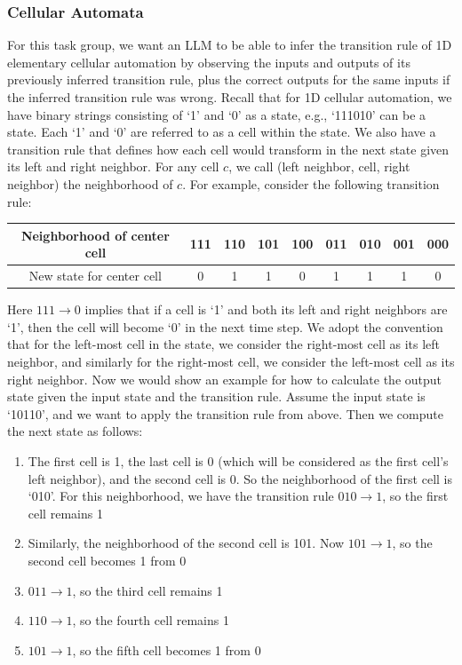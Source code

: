 \documentclass{article}
\theoremstyle{plain}
\theoremstyle{definition}
\theoremstyle{remark}
\begin{document}
\subsubsection{Cellular Automata}
For this task group, we want an LLM to be able to infer the transition rule of 1D elementary cellular automation by observing the inputs and outputs of its previously inferred transition rule, plus the correct outputs for the same inputs if the inferred transition rule was wrong. Recall that for 1D cellular automation, we have binary strings consisting of `1' and `0' as a state, e.g., `111010' can be a state. Each `1' and `0' are referred to as a cell within the state. We also have a transition rule that defines how each cell would transform in the next state given its left and right neighbor. For any cell $c$, we call (left neighbor, cell, right neighbor) the neighborhood of $c$.
For example, consider the following transition rule:
\begin{table}[h]
\centering
\begin{tabular}{|c|c|c|c|c|c|c|c|c|}
\hline
Neighborhood of center cell & 111 & 110 & 101 & 100 & 011 & 010 & 001 & 000 \\
\hline
New state for center cell & 0 & 1 & 1 & 0 & 1 & 1 & 1 & 0 \\
\hline
\end{tabular}
\end{table}
Here $111 \rightarrow 0$ implies that if a cell is `1' and both its left and right neighbors are `1', then the cell will become `0' in the next time step.  We adopt the convention that for the left-most cell in the state, we consider the right-most cell as its left neighbor, and similarly for the right-most cell, we consider the left-most cell as its right neighbor.
Now we would show an example for how to calculate the output state given the input state and the transition rule. Assume the input state is `10110', and we want to apply the transition rule from above. Then we compute the next state as follows:
\begin{enumerate}
    \item The first cell is 1, the last cell is 0 (which will be considered as the first cell's left neighbor), and the second cell is 0. So the neighborhood of the first cell is `010'. For this neighborhood, we have the transition rule $010 \rightarrow 1$, so the first cell remains 1
    \item Similarly, the neighborhood of the second cell is 101. Now $101 \rightarrow 1$, so the second cell becomes 1 from 0
    \item $011 \rightarrow 1$, so the third cell remains 1
    \item $110 \rightarrow 1$, so the fourth cell remains 1
    \item $101 \rightarrow 1$, so the fifth cell becomes 1 from 0
\end{enumerate}
\end{document}
